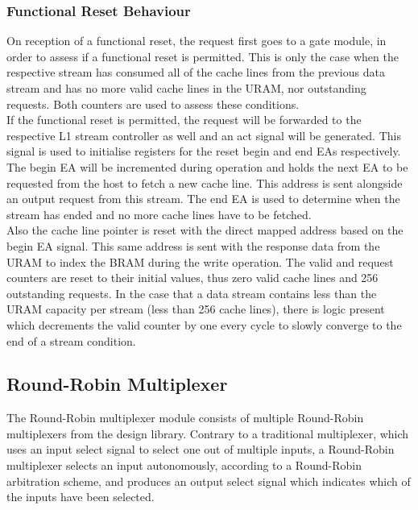 \subsubsection{Functional Reset Behaviour}
On reception of a functional reset, the request first goes to a gate module, in order to assess if a functional reset is permitted. This is only the case when the respective stream has consumed all of the cache lines from the previous data stream and has no more valid cache lines in the URAM, nor outstanding requests. Both counters are used to assess these conditions.\\
If the functional reset is permitted, the request will be forwarded to the respective L1 stream controller as well and an act signal will be generated. This signal is used to initialise registers for the reset begin and end EAs respectively. The begin EA will be incremented during operation and holds the next EA to be requested from the host to fetch a new cache line. This address is sent alongside an output request from this stream. The end EA is used to determine when the stream has ended and no more cache lines have to be fetched.\\
Also the cache line pointer is reset with the direct mapped address based on the begin EA signal. This same address is sent with the response data from the URAM to index the BRAM during the write operation. The valid and request counters are reset to their initial values, thus zero valid cache lines and 256 outstanding requests. In the case that a data stream contains less than the URAM capacity per stream (less than 256 cache lines), there is logic present which decrements the valid counter by one every cycle to slowly converge to the end of a stream condition.



\subsection{Round-Robin Multiplexer}

The Round-Robin multiplexer module consists of multiple Round-Robin multiplexers from the design library. Contrary to a traditional multiplexer, which uses an input select signal to select one out of multiple inputs, a Round-Robin multiplexer selects an input autonomously, according to a Round-Robin arbitration scheme, and produces an output select signal which indicates which of the inputs have been selected.

